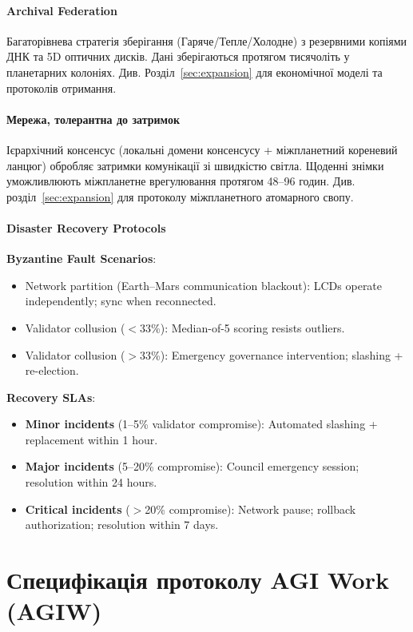 \documentclass[11pt]{article}
\begin{document}
\paragraph{Archival Federation}
Багаторівнева стратегія зберігання (Гаряче/Тепле/Холодне) з резервними копіями ДНК та 5D оптичних дисків. Дані зберігаються протягом тисячоліть у планетарних колоніях. Див. Розділ~\ref{sec:expansion} для економічної моделі та протоколів отримання.

\paragraph{Мережа, толерантна до затримок}
Ієрархічний консенсус (локальні домени консенсусу + міжпланетний кореневий ланцюг) обробляє затримки комунікації зі швидкістю світла. Щоденні знімки уможливлюють міжпланетне врегулювання протягом 48--96 годин. Див. розділ~\ref{sec:expansion} для протоколу міжпланетного атомарного свопу.

\paragraph{Disaster Recovery Protocols}
\textbf{Byzantine Fault Scenarios}:
\begin{itemize}[noitemsep]
  \item Network partition (Earth--Mars communication blackout): LCDs operate independently; sync when reconnected.
  \item Validator collusion ($<$33\%): Median-of-5 scoring resists outliers.
  \item Validator collusion ($>$33\%): Emergency governance intervention; slashing + re-election.
\end{itemize}

\textbf{Recovery SLAs}:
\begin{itemize}[noitemsep]
  \item \textbf{Minor incidents} (1--5\% validator compromise): Automated slashing + replacement within 1 hour.
  \item \textbf{Major incidents} (5--20\% compromise): Council emergency session; resolution within 24 hours.
  \item \textbf{Critical incidents} ($>$20\% compromise): Network pause; rollback authorization; resolution within 7 days.
\end{itemize}

\section{Специфікація протоколу AGI Work (AGIW)}
\label{sec:agiw-spec}
\end{document}
